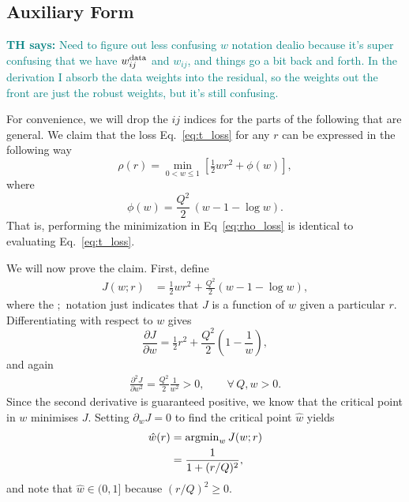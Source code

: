 \documentclass[onecolumn,floatfix]{aastex631}
\newcommand{\tom}[1]{\textcolor{teal}{\textbf{TH says:} #1}}
\begin{document}
\subsection{Auxiliary Form}

\tom{Need to figure out less confusing $w$ notation dealio because it's super confusing that we have $w_{ij}^{\rm data}$ and $w_{ij}$, and things go a bit back and forth. In the derivation I absorb the data weights into the residual, so the weights out the front are just the robust weights, but it's still confusing.}

For convenience, we will drop the $ij$ indices for the parts of the following that are general.
We claim that the loss Eq.~\eqref{eq:t_loss} for any $r$ can be expressed in the following way
\begin{equation}
    \rho(r) = \min_{0<w\leq1} \left[ \tfrac{1}{2} w r^2 + \phi(w) \right], \label{eq:rho_loss}
\end{equation}
where
\begin{equation}
    \phi(w) = \frac{Q^2}{2}\,(w - 1 - \log w).
\end{equation}
That is, performing the minimization in Eq~\eqref{eq:rho_loss} is identical to evaluating Eq.~\eqref{eq:t_loss}.

We will now prove the claim. First, define
\begin{align}
    J\left( w ; r \right) &= \tfrac{1}{2} w r^2 + \tfrac{Q^2}{2} \left( w - 1 - \log{w}\right), \label{eq:J_def}
\end{align}
where the $;$ notation just indicates that $J$ is a function of $w$ given a particular $r$.
Differentiating with respect to $w$ gives
\begin{equation}
    \frac{\partial J}{\partial w}
    = \tfrac{1}{2}r^2 + \frac{Q^2}{2}\left(1 - \frac{1}{w}\right),
\end{equation}
and again
\begin{align}
    \frac{\partial^2 J}{\partial w^2} = \frac{Q^2}{2} \frac{1}{w^2} > 0, \qquad \forall \, Q,w > 0.
\end{align}
Since the second derivative is guaranteed positive, we know that the critical point in $w$ minimises $J$.
Setting $\partial_w J=0$ to find the critical point $\hat{w}$ yields
\begin{align}
    \hat{w}(r) &= {\rm argmin}_w \, J (w ; r) \\
    &= \frac{1}{1 + (r/Q)^2}, \label{eq:w_hat}
\end{align}
and note that $\hat{w} \in (0, 1]$ because $(r/Q)^2 \geq 0$.
\end{document}
